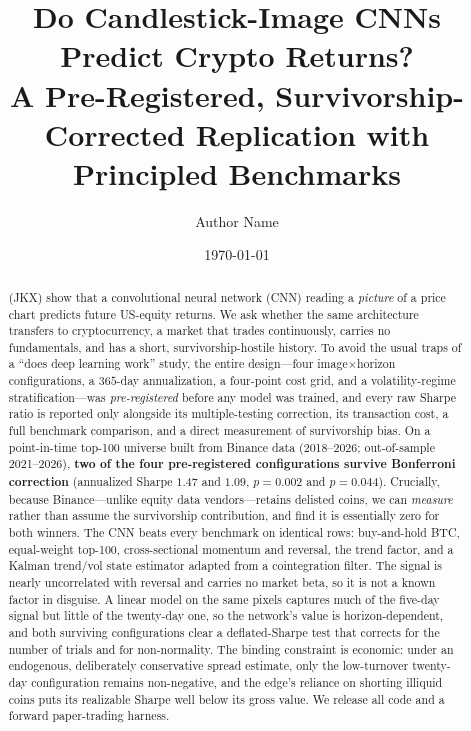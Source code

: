 \documentclass[11pt]{article}
\title{\bfseries Do Candlestick-Image CNNs Predict Crypto Returns?\\
A Pre-Registered, Survivorship-Corrected Replication with\\ Principled Benchmarks}
\author[1]{Author Name}
\affil[1]{Affiliation\\ \texttt{aps9412@gmail.com}}
\date{\today}
\begin{document}
\maketitle

\begin{abstract}
\citet{jiang2023reimagining} (JKX) show that a convolutional neural network (CNN) reading a
\emph{picture} of a price chart predicts future US-equity returns. We ask whether the same
architecture transfers to cryptocurrency, a market that trades continuously, carries no
fundamentals, and has a short, survivorship-hostile history. To avoid the usual traps of a
``does deep learning work'' study, the entire design---four image$\times$horizon configurations,
a $365$-day annualization, a four-point cost grid, and a volatility-regime stratification---was
\emph{pre-registered} before any model was trained, and every raw Sharpe ratio is reported only
alongside its multiple-testing correction, its transaction cost, a full benchmark comparison, and
a direct measurement of survivorship bias. On a point-in-time top-100 universe built from Binance
data (2018--2026; out-of-sample 2021--2026), \textbf{two of the four pre-registered configurations
survive Bonferroni correction} (annualized Sharpe $1.47$ and $1.09$, $p=0.002$ and $p=0.044$).
Crucially, because Binance---unlike equity data vendors---retains delisted coins, we can
\emph{measure} rather than assume the survivorship contribution, and find it is essentially zero
for both winners. The CNN beats every benchmark on identical rows: buy-and-hold BTC, equal-weight
top-100, cross-sectional momentum and reversal, the \citet{han2016trend} trend factor, and a
Kalman trend/vol state estimator adapted from a cointegration filter. The signal is nearly
uncorrelated with reversal and carries no market beta, so it is not a known factor in disguise.
A linear model on the same pixels captures much of the five-day signal but little of the twenty-day
one, so the network's value is horizon-dependent, and both surviving configurations clear a
deflated-Sharpe test that corrects for the number of trials and for non-normality. The binding
constraint is economic: under an endogenous, deliberately conservative \citet{corwin2012simple}
spread estimate, only the low-turnover twenty-day configuration remains non-negative, and the
edge's reliance on shorting illiquid coins puts its realizable Sharpe well below its gross value.
We release all code and a forward paper-trading harness.
\end{abstract}
\end{document}
